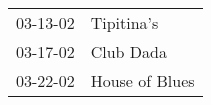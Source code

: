 \begin{supertabular}{p{0.07\textwidth}p{0.23\textwidth}}
 03-13-02 &      Tipitina's \\
 03-17-02 &       Club Dada \\
 03-22-02 &  House of Blues \\
\end{supertabular}
